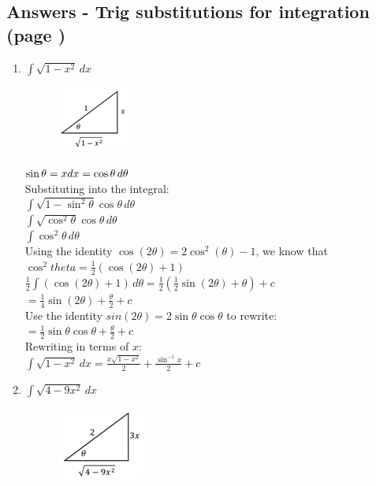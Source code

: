 \documentclass[../main.tex]{subfiles}
\begin{document}
\subsection*{Answers - Trig substitutions for integration (page \pageref{Trig substitution})}
\begin{enumerate}
    \item 
    \(\int \sqrt{1-x^2}\,dx\)
    \begin{figure}[h]
        \includegraphics{images/trigsuba1.png}
    \end{figure}

    \(\sin{\theta}=x\\
    dx=\cos{\theta}\, d\theta\)\\
    
    Substituting into the integral:\\
    \(\int \sqrt{1-\sin^2{\theta}}\cos{\theta}\,d\theta\)\\
    \(\int \sqrt{\cos^2{\theta}}\cos{\theta}\,d\theta\)\\
    \(\int \cos^2{\theta} \,d\theta\)\\

    Using the identity \(\cos{(2\theta)}=2\cos^2{(\theta)}-1\), we know that \(\cos^2{theta}=\frac{1}{2}(\cos{(2\theta)}+1)\)\\

    \(\frac{1}{2}\int (\cos{(2\theta)}+1)\,d\theta=\frac{1}{2}(\frac{1}{2}\sin{(2\theta)}+\theta)+c\)\\

    \(=\frac{1}{4}\sin{(2\theta)}+\frac{\theta}{2}+c\)\\

    Use the identity \(sin{(2\theta)}=2\sin{\theta}\cos{\theta}\) to rewrite:\\
    \(=\frac{1}{2}\sin{\theta}\cos{\theta}+\frac{\theta}{2}+c\)\\

    Rewriting in terms of \(x\):\\
    \(\int \sqrt{1-x^2}\,dx=\frac{x\sqrt{1-x^2}}{2}+\frac{\sin^{-1}{x}}{2}+c\)\\

    \item 
    \(\int \sqrt{4-9x^2}\,dx\)
    \begin{figure}[h]
        \includegraphics{images/trigsuba2.png}
    \end{figure}


\end{enumerate}
\end{document}
